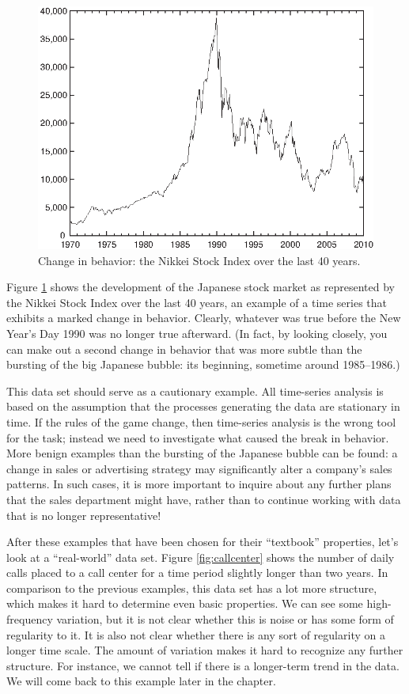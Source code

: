 \begin{figure}[t!]
   \centerline{\includegraphics{img/nikkei}}
  \caption{Change in behavior: the Nikkei Stock Index over the last 
    40 years.}
  \label{fig:nikkei}
\end{figure}

Figure \ref{fig:nikkei} shows the development of the Japanese stock
market as represented by the Nikkei Stock Index over the last 40
years, an example of a time\vadjust{\pagebreak} series that exhibits a marked change in
behavior. Clearly, whatever was true before the New
Year's Day 1990 was no longer true afterward. (In fact, by looking
closely, you can make out a second change in behavior that was more
subtle than the bursting of the big Japanese bubble: its beginning,
sometime around 1985--1986.)

This data set should serve as a cautionary example. All time-series
analysis is based on the assumption that the processes generating the
data are stationary in time. If the rules of the game change, then
time-series analysis is the wrong tool for the task; instead we need
to investigate what caused the break in behavior. More benign examples
than the bursting of the Japanese bubble can be found: a change in
sales or advertising strategy may significantly alter a company's
sales patterns. In such cases, it is more important to inquire about
any further plans that the sales department might have, rather than to
continue working with data that is no longer representative!

After these examples that have been chosen for their ``textbook''
properties, let's look at a ``real-world'' data set. Figure
\ref{fig:callcenter} shows the number of daily calls placed to a call
center for a time period slightly longer than two years. In comparison
to the previous examples, this data set has a lot more structure,
which  makes it hard to determine even basic properties. We can see
some high-frequency variation, but it is not clear whether this is
noise or has some form of regularity to it. It is also not clear
whether there is any sort of regularity on a longer time scale.  The
amount of variation makes it hard to recognize any further structure.
For instance, we cannot tell if there is a longer-term trend in the
data. We will come back to this example later in the chapter.

